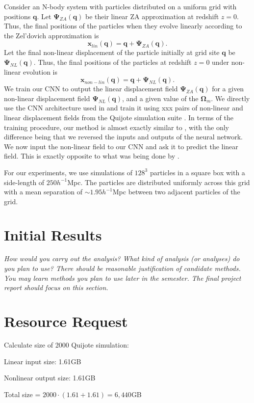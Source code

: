 \documentclass[11pt]{article}
\begin{document}
Consider an N-body system with particles distributed on a uniform grid with positions $\mathbf{q}$. Let $\mathbf{\Psi}_{ZA}(\mathbf{q})$ be their linear ZA approximation at redshift $z=0$. Thus, the final positions of the particles when they evolve linearly according to the Zel'dovich approximation is
$$\mathbf{x}_{lin}(\mathbf{q}) = \mathbf{q} + \mathbf{\Psi}_{ZA}(\mathbf{q}).$$
Let the final non-linear displacement of the particle initially at grid site $\mathbf{q}$ be $\mathbf{\Psi}_{NL}(\mathbf{q})$. Thus, the final positions of the particles at redshift $z=0$ under non-linear evolution is 
$$\mathbf{x}_{non-lin}(\mathbf{q}) = \mathbf{q} + \mathbf{\Psi}_{NL}(\mathbf{q}).$$
We train our CNN to output the linear displacement field $\mathbf{\Psi}_{ZA}(\mathbf{q})$ for a given non-linear displacement field $\mathbf{\Psi}_{NL}(\mathbf{q})$, and a given value of the $\mathbf{\Omega}_m$.
We directly use the CNN architecture used in \cite{https://doi.org/10.48550/arxiv.2206.04594} and train it using xxx pairs of non-linear and linear displacement fields from the Quijote simulation suite \cite{villaescusa}. In terms of the training procedure, our method is almost exactly similar to \cite{https://doi.org/10.48550/arxiv.2206.04594}, with the only difference being that we reversed the inputs and outputs of the neural network. We now input the non-linear field to our CNN and ask it to predict the linear field. This is exactly opposite to what was being done by \cite{https://doi.org/10.48550/arxiv.2206.04594}.

For our experiments, we use simulations of $128^3$ particles in a square box with a side-length of $250 h^{-1}$Mpc. The particles are distributed uniformly across this grid with a mean separation of $\sim1.95 h^{-1}$Mpc between two adjacent particles of the grid.

\section{Initial Results}

\textit{How would you carry out the analysis? What kind of analysis (or analyses) do you plan to use? There should be reasonable justification of candidate methods. You may learn methods you plan to use later in the semester. The final project report should focus on this section.}

\section{Resource Request}

Calculate size of 2000 Quijote simulation:

Linear input size: 1.61GB

Nonlinear output size: 1.61GB

Total size = $2000 \cdot (1.61 + 1.61) = 6,440$GB

\pagebreak

\printbibliography
\end{document}
